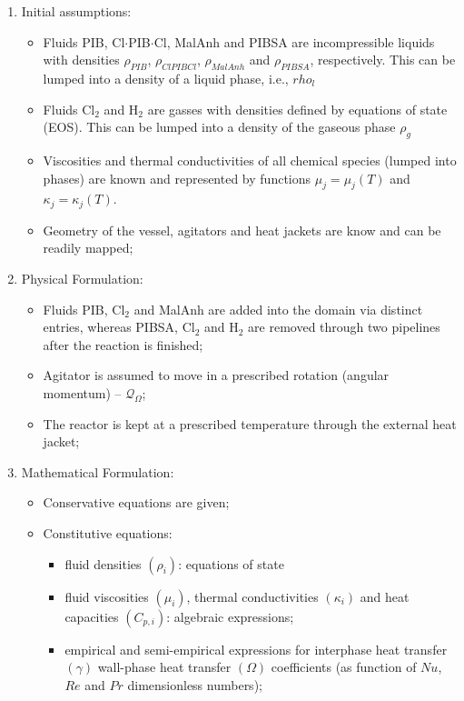\documentclass[12pts,a4paper,amsmath,amssymb,floatfix]{article}%
\newcounter{reaction}
\begin{document}
\begin{enumerate}
%
\item Initial assumptions:
\begin{itemize}
\item Fluids PIB, Cl$\cdot$PIB$\cdot$Cl, MalAnh and PIBSA are incompressible liquids with densities $\rho_{PIB}$, $\rho_{ClPIBCl}$, $\rho_{MalAnh}$ and $\rho_{PIBSA}$, respectively. This can be lumped into a density of a liquid phase, i.e., $rho_{l}$
\item Fluids Cl$_{2}$ and H$_{2}$ are gasses with densities defined by equations of state (EOS). This can be lumped into a density of the gaseous phase $\rho_{g}$
\item Viscosities and thermal conductivities of all chemical species (lumped into phases) are known and represented by functions $\mu_{j}=\mu_{j}(T)$ and $\kappa_{j}=\kappa_{j}(T)$.
\item Geometry of the vessel, agitators and heat jackets are know and can be readily mapped;
\end{itemize}
%
\item Physical Formulation:
\begin{itemize}
\item Fluids PIB, Cl$_{2}$ and MalAnh are added into the domain via distinct entries, whereas PIBSA, Cl$_{2}$ and H$_{2}$ are removed through two pipelines after the reaction is finished;
\item Agitator is assumed to move in a prescribed rotation (angular momentum) -- $\mathcal{Q}_{\Omega}$;
\item The reactor is kept at a prescribed temperature through the external heat jacket;
\end{itemize}
%
\item Mathematical Formulation:
\begin{itemize}
\item Conservative equations are given;
\item Constitutive equations:
\begin{itemize}
\item fluid densities $\left(\rho_{i}\right)$: equations of state
\item fluid viscosities $\left(\mu_{i}\right)$, thermal conductivities $\left(\kappa_{i}\right)$ and heat capacities $\left(C_{p,i}\right)$: algebraic expressions;
\item empirical and semi-empirical expressions for interphase heat transfer $\left(\gamma\right)$ wall-phase heat transfer $\left(\Omega\right)$ coefficients (as function of $Nu$, $Re$ and $Pr$ dimensionless numbers);

\end{itemize}
\end{itemize}
\end{enumerate}
\end{document}
